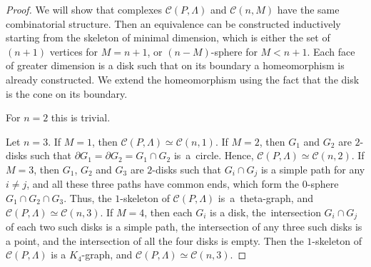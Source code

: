 \documentclass[12pt]{amsart}
\theoremstyle{definition}
\theoremstyle{remark}
\begin{document}
\begin{proof}
We will show that complexes $\mathcal{C}(P,\Lambda)$ and $\mathcal{C}(n,M)$ have the same  
combinatorial structure. Then an equivalence can be constructed inductively starting from the skeleton
of minimal dimension, which is either the set of $(n+1)$ vertices for $M=n+1$, or $(n-M)$-sphere for $M<n+1$. 
Each face of greater dimension is a disk such that on its boundary a homeomorphism is already constructed. 
We extend the homeomorphism using the fact that the disk is the cone on its boundary.


For $n=2$ this is trivial. 

Let $n=3$. If $M=1$, then $\mathcal{C}(P,\Lambda)\simeq \mathcal{C}(n,1)$.  If $M=2$,
then $G_1$ and $G_2$ are $2$-disks such that $\partial G_1=\partial G_2=G_1\cap G_2$ is~a~circle. Hence,
$\mathcal{C}(P,\Lambda)\simeq \mathcal{C}(n,2)$. If $M=3$, then $G_1$, $G_2$ and $G_3$ are $2$-disks 
such that $G_i\cap G_j$ is a simple path for any $i\ne j$, and all these three paths have common ends,
which form the $0$-sphere $G_1\cap G_2\cap G_3$. Thus, the $1$-skeleton of $\mathcal{C}(P,\Lambda)$ is~a~theta-graph,
and $\mathcal{C}(P,\Lambda)\simeq \mathcal{C}(n,3)$. If $M=4$, then each $G_i$ is a disk, the~intersection 
$G_i\cap G_j$ of each two such disks is a simple path, the intersection of any three such disks is a point, and the intersection
of all the four disks is empty. Then the $1$-skeleton of $\mathcal{C}(P,\Lambda)$ is a $K_4$-graph, and  
$\mathcal{C}(P,\Lambda)\simeq \mathcal{C}(n,3)$.


\end{proof}
\end{document}
